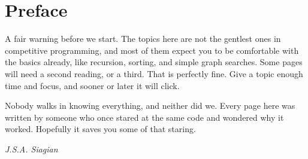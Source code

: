 \section*{Preface}
A fair warning before we start. The topics here are not the gentlest ones in competitive programming, and most of them expect you to be comfortable with the basics already, like recursion, sorting, and simple graph searches. Some pages will need a second reading, or a third. That is perfectly fine. Give a topic enough time and focus, and sooner or later it will click.

Nobody walks in knowing everything, and neither did we. Every page here was written by someone who once stared at the same code and wondered why it worked. Hopefully it saves you some of that staring.

\medskip
{\raggedleft\itshape J.S.A. Siagian\par}

